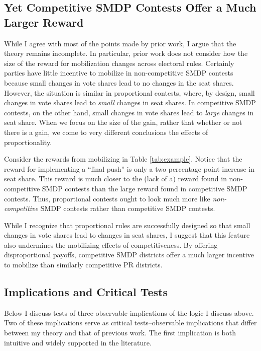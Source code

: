 \documentclass[12pt]{article}
\begin{document}
\subsection*{Yet Competitive SMDP Contests Offer a Much Larger Reward}

While I agree with most of the points made by prior work, I argue that the theory remains incomplete. In particular, prior work does not consider how the size of the reward for mobilization changes across electoral rules. Certainly parties have little incentive to mobilize in non-competitive SMDP contests because small changes in vote shares lead to no changes in the seat shares. However, the situation is similar in proportional contests, where, by design, small changes in vote shares lead to \textit{small} changes in seat shares. In competitive SMDP contests, on the other hand, small changes in vote shares lead to \textit{large} changes in seat share. When we focus on the size of the gain, rather that whether or not there is a gain, we come to very different conclusions the effects of proportionality.

Consider the rewards from mobilizing in Table \ref{tab:example}. Notice that the reward for implementing a ``final push'' is only a two percentage point increase in seat share. This reward is much closer to the (lack of a) reward found in non-competitive SMDP contests than the large reward found in competitive SMDP contests. Thus, proportional contests ought to look much more like \textit{non-competitive} SMDP contests rather than competitive SMDP contests.

While I recognize that proportional rules are successfully designed so that small changes in vote shares lead to changes in seat shares, I suggest that this feature also undermines the mobilizing effects of competitiveness. By offering disproportional payoffs, competitive SMDP districts offer a much larger incentive to mobilize than similarly competitive PR districts. 

\subsection*{Implications and Critical Tests}

Below I discuss tests of three observable implications of the logic I discuss above. Two of these implications serve as critical tests--observable implications that differ between my theory and that of previous work. The first implication is both intuitive and widely supported in the literature.
\end{document}
